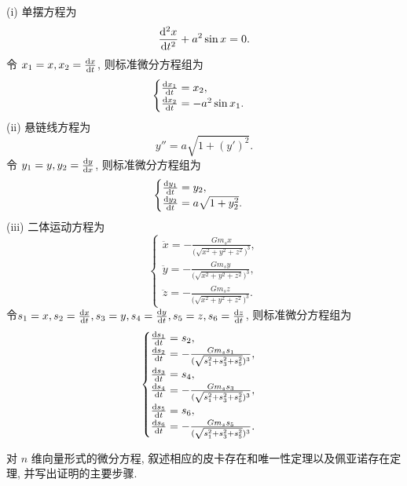 \begin{solution} 
  (i) 单摆方程为
  \[\frac{\mathop{}\!\mathrm{d}^2x}{\mathop{}\!\mathrm{d} t^2}+a^2\sin x=0.\]
  令 $x_1=x,x_2=\frac{\mathop{}\!\mathrm{d} x}{\mathop{}\!\mathrm{d} t}$, 则标准微分方程组为
  \[\begin{cases}
  \frac{\mathop{}\!\mathrm{d} x_1}{\mathop{}\!\mathrm{d} t}=x_2, \\
  \frac{\mathop{}\!\mathrm{d} x_2}{\mathop{}\!\mathrm{d} t}=-a^2\sin x_1.
  \end{cases}\]
  (ii) 悬链线方程为
  \[y''=a\sqrt{1+(y')^2}.\]
  令 $y_1=y,y_2=\frac{\mathop{}\!\mathrm{d} y}{\mathop{}\!\mathrm{d} x}$, 则标准微分方程组为
  \[\begin{cases}
  \frac{\mathop{}\!\mathrm{d} y_1}{\mathop{}\!\mathrm{d} t}=y_2, \\
  \frac{\mathop{}\!\mathrm{d} y_2}{\mathop{}\!\mathrm{d} t}=a\sqrt{1+y_2^2}.
  \end{cases}\]
  (iii) 二体运动方程为
  \[\begin{cases}
  \ddot{x} = -\frac{Gm_sx}{\bigl(\sqrt{x^2+y^2+z^2}\bigr)^3}, \\
  \ddot{y} = -\frac{Gm_sy}{\bigl(\sqrt{x^2+y^2+z^2}\bigr)^3}, \\
  \ddot{z} = -\frac{Gm_sz}{\bigl(\sqrt{x^2+y^2+z^2}\bigr)^3}.
  \end{cases}\]
  令$s_1=x,s_2=\frac{\mathop{}\!\mathrm{d} x}{\mathop{}\!\mathrm{d} t},s_3=y,s_4=\frac{\mathop{}\!\mathrm{d} y}{\mathop{}\!\mathrm{d} t},s_5=z,s_6=\frac{\mathop{}\!\mathrm{d} z}{\mathop{}\!\mathrm{d} t}$, 则标准微分方程组为
  \[\begin{cases}
  \frac{\diff s_1}{\diff t} = s_2, \\
  \frac{\diff s_2}{\diff t} = -\frac{Gm_ss_1}{(\sqrt{s_1^2+s_3^2+s_5^2})^3}, \\
  \frac{\diff s_3}{\diff t} = s_4,\\
  \frac{\diff s_4}{\diff t} = -\frac{Gm_ss_3}{(\sqrt{s_1^2+s_3^2+s_5^2})^3}, \\
  \frac{\diff s_5}{\diff t} = s_6,\\
  \frac{\diff s_6}{\diff t} = -\frac{Gm_ss_5}{(\sqrt{s_1^2+s_3^2+s_5^2})^3}.
  \end{cases}\]
\end{solution}



\begin{exercise}
  对 $n$ 维向量形式的微分方程, 叙述相应的皮卡存在和唯一性定理以及佩亚诺存在定理, 并写出证明的主要步骤.
\end{exercise}

